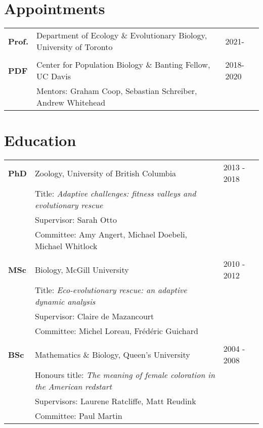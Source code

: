 \documentclass[12pt]{article}
\begin{document}

\section*{Appointments}

\begin{tabular}{lll}
\textbf{Prof.} & Department of Ecology \& Evolutionary Biology, University of Toronto\hspace{0.5cm} & 2021-\\
\\
\textbf{PDF} & Center for Population Biology \& Banting Fellow, UC Davis & 2018-2020\\
& Mentors: Graham Coop, Sebastian Schreiber, Andrew Whitehead
\end{tabular}

\section*{Education}

\begin{tabular}{lll}
\textbf{PhD} & Zoology, University of British Columbia & 2013 - 2018\\
& Title: \textit{Adaptive challenges: fitness valleys and evolutionary rescue}\\
& Supervisor: Sarah Otto\\
& Committee: Amy Angert, Michael Doebeli, Michael Whitlock\\
\\
\textbf{MSc} & Biology, McGill University & 2010 - 2012 \\
& Title: \textit{Eco-evolutionary rescue: an adaptive dynamic analysis}  \\
& Supervisor: Claire de Mazancourt\\
& Committee: Michel Loreau, Fr\'{e}d\'{e}ric Guichard\\
\\
\textbf{BSc} &  Mathematics \& Biology, Queen's University & 2004 - 2008\\ %
& Honours title: \textit{The meaning of female coloration in the American redstart}  \\
& Supervisors: Laurene Ratcliffe, Matt Reudink\\
& Committee: Paul Martin\\
\end{tabular}
\end{document}
